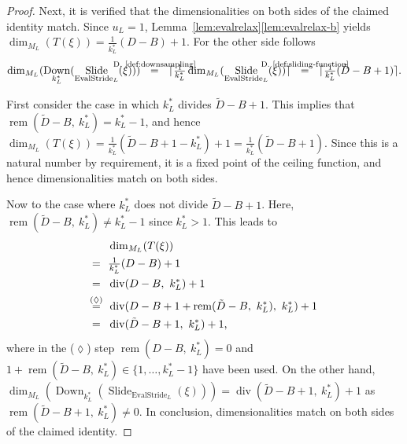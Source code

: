 \documentclass[journal]{IEEEtran}
\newcommand{\ROI}{B}
\newcommand{\discint}[2]{\{#1,\dotsc,#2\}}
\newcommand{\inint}[2]{\in\discint{#1}{#2}}
\newcommand{\nceil}[1]{\lceil #1 \rceil}
\DeclareMathOperator{\Slide}{Slide}
\DeclareMathOperator{\EvalStride}{EvalStride}
\renewcommand{\div}[2]{\operatorname{div}(#1,\ #2)}
\newcommand{\rem}[2]{\operatorname{rem}(#1,\ #2)}
\newcommand{\equsing}[1]{\overset{\mathclap{\text{#1}}}{=}}
\DeclareMathOperator{\Downsampling}{Down}
\begin{document}
\begin{proof}
Next, it is verified that the dimensionalities on both sides of the claimed identity match.
Since $u_L = 1$, Lemma~\ref{lem:evalrelax}\ref{lem:evalrelax-b} yields $\dim_{M_L}(T(\xi)) = \frac{1}{k_L^*}(D - \ROI) + 1$.
For the other side follows
\begin{displaymath}
  \dim_{M_L}(\Downsampling_{k_L^*}(\Slide_{\EvalStride_L}(\xi)))
  \ \ \equsing{D.~\ref{def:downsampling}}\ \ \nceil{\tfrac{1}{k_L^*} \dim_{M_L}(\Slide_{\EvalStride_L}(\xi))}
  \ \ \equsing{D.~\ref{def:sliding-function}}\ \ \nceil{\tfrac{1}{k_L^*}(\tilde{D} - \ROI + 1)}\text{.}
\end{displaymath}

First consider the case in which $k_L^*$ divides $\tilde{D} - \ROI + 1$.
This implies that $\rem{\tilde{D} - \ROI}{k_L^*} = k_L^* - 1$, and hence $\dim_{M_L}(T(\xi)) = \frac{1}{k_L^*}(\tilde{D} - \ROI + 1 - k_L^*) + 1 = \frac{1}{k_L^*}(\tilde{D} - \ROI + 1)$.
Since this is a natural number by requirement, it is a fixed point of the ceiling function, and hence dimensionalities match on both sides.

Now to the case where $k_L^*$ does not divide $\tilde{D} - \ROI + 1$.
Here, $\rem{\tilde{D} - \ROI}{k_L^*} \neq k_L^* - 1$ since $k_L^* > 1$.
This leads to
\begin{align*}
  & \dim_{M_L}(T(\xi))\\
  =\ \ & \tfrac{1}{k_L^*}(D - \ROI) + 1\\
  =\ \ & \div{D - \ROI}{k_L^*} + 1\\
  \equsing{($\lozenge$)}\ \ & \div{D - \ROI + 1 + \rem{\tilde{D} - \ROI}{k_L^*}}{k_L^*} + 1\\
  =\ \ & \div{\tilde{D} - \ROI + 1}{k_L^*} + 1\text{,}
\end{align*}
where in the ($\lozenge$) step $\rem{D - \ROI}{k_L^*} = 0$ and $1 + \rem{\tilde{D} - \ROI}{k_L^*}\inint{1}{k_L^* - 1}$ have been used.
On the other hand, $\dim_{M_L}(\Downsampling_{k_L^*}(\Slide_{\EvalStride_L}(\xi))) = \div{\tilde{D} - \ROI + 1}{k_L^*} + 1$ as $\rem{\tilde{D} - \ROI + 1}{k_L^*}\neq 0$.
In conclusion, dimensionalities match on both sides of the claimed identity.


\end{proof}
\end{document}

